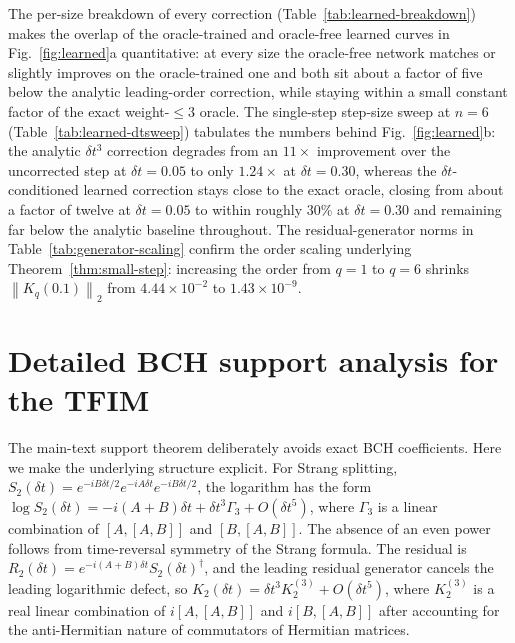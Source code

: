 \documentclass[aps,prresearch,reprint,superscriptaddress,nofootinbib,amsmath,amssymb]{revtex4-2}
\newcommand{\norm}[1]{\left\lVert #1 \right\rVert}
\newcommand{\dt}{\delta t}
\begin{document}






The per-size breakdown of every correction (Table~\ref{tab:learned-breakdown}) makes the overlap of the oracle-trained and oracle-free learned curves in Fig.~\ref{fig:learned}a quantitative: at every size the oracle-free network matches or slightly improves on the oracle-trained one and both sit about a factor of five below the analytic leading-order correction, while staying within a small constant factor of the exact weight-$\leq3$ oracle. The single-step step-size sweep at $n=6$ (Table~\ref{tab:learned-dtsweep}) tabulates the numbers behind Fig.~\ref{fig:learned}b: the analytic $\dt^3$ correction degrades from an $11\times$ improvement over the uncorrected step at $\dt=0.05$ to only $1.24\times$ at $\dt=0.30$, whereas the $\dt$-conditioned learned correction stays close to the exact oracle, closing from about a factor of twelve at $\dt=0.05$ to within roughly $30\%$ at $\dt=0.30$ and remaining far below the analytic baseline throughout. The residual-generator norms in Table~\ref{tab:generator-scaling} confirm the order scaling underlying Theorem~\ref{thm:small-step}: increasing the order from $q=1$ to $q=6$ shrinks $\norm{K_q(0.1)}_2$ from $4.44\times10^{-2}$ to $1.43\times10^{-9}$.

\section{Detailed BCH support analysis for the TFIM}
\label{app:bch}

The main-text support theorem deliberately avoids exact BCH coefficients. Here we make the underlying structure explicit. For Strang splitting, $S_2(\dt)=e^{-iB\dt/2}e^{-iA\dt}e^{-iB\dt/2}$, the logarithm has the form $\log S_2(\dt)=-i(A+B)\dt+\dt^3\Gamma_3+O(\dt^5)$, where $\Gamma_3$ is a linear combination of $[A,[A,B]]$ and $[B,[A,B]]$. The absence of an even power follows from time-reversal symmetry of the Strang formula. The residual is $R_2(\dt)=e^{-i(A+B)\dt}S_2(\dt)^\dagger$, and the leading residual generator cancels the leading logarithmic defect, so $K_2(\dt)=\dt^3K_2^{(3)}+O(\dt^5)$, where $K_2^{(3)}$ is a real linear combination of $i[A,[A,B]]$ and $i[B,[A,B]]$ after accounting for the anti-Hermitian nature of commutators of Hermitian matrices.
\end{document}
